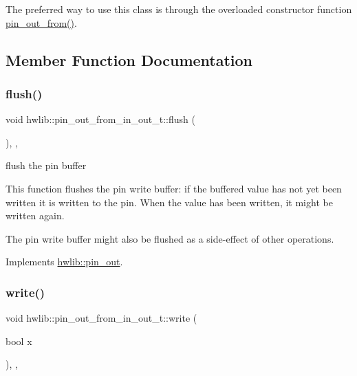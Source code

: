 The preferred way to use this class is through the overloaded constructor function \hyperlink{namespacehwlib_aa1e6aac16c5ac14715e165b463ec6a46}{pin\+\_\+out\+\_\+from()}. 

\subsection{Member Function Documentation}
\mbox{\label{classhwlib_1_1pin__out__from__in__out__t_a7b2e19b1916d922557ab2881b92085f3}} 
\subsubsection{\texorpdfstring{flush()}{flush()}}
{\footnotesize\ttfamily void hwlib\+::pin\+\_\+out\+\_\+from\+\_\+in\+\_\+out\+\_\+t\+::flush (\begin{DoxyParamCaption}{ }\end{DoxyParamCaption})\hspace{0.3cm}{\ttfamily [inline]}, {\ttfamily [override]}, {\ttfamily [virtual]}}





flush the pin buffer

This function flushes the pin write buffer\+: if the buffered value has not yet been written it is written to the pin. When the value has been written, it might be written again.

The pin write buffer might also be flushed as a side-\/effect of other operations. 

Implements \hyperlink{classhwlib_1_1pin__out_ac22910317477a52431a44e7e3c66fc57}{hwlib\+::pin\+\_\+out}.

\mbox{\label{classhwlib_1_1pin__out__from__in__out__t_a6171cefa50ff9db91e17eb6e1d8a3d74}} 
\subsubsection{\texorpdfstring{write()}{write()}}
{\footnotesize\ttfamily void hwlib\+::pin\+\_\+out\+\_\+from\+\_\+in\+\_\+out\+\_\+t\+::write (\begin{DoxyParamCaption}\item[{bool}]{x }\end{DoxyParamCaption})\hspace{0.3cm}{\ttfamily [inline]}, {\ttfamily [override]}, {\ttfamily [virtual]}}





